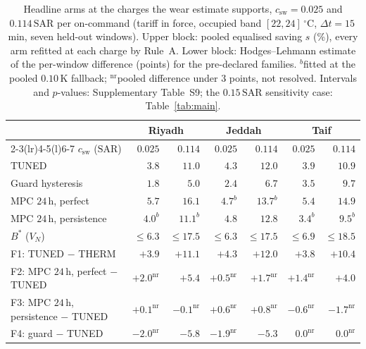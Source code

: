 \documentclass[3p,twocolumn,number]{elsarticle}
\newcommand{\csw}{c_{\mathrm{sw}}}
\newcommand{\SAR}{\text{SAR}}
\begin{document}
\begin{table}[t]
\centering
\caption{Headline arms at the charges the wear estimate supports, $\csw=0.025$ and $0.114\,\SAR$ per on-command (tariff in force, occupied band $[22,24]\,^\circ$C, $\Delta t=15\,$min, seven held-out windows). Upper block: pooled equalised saving $s$ (\%), every arm refitted at each charge by Rule~A. Lower block: Hodges--Lehmann estimate of the per-window difference (points) for the pre-declared families. $^{b}$fitted at the pooled $0.10\,$K fallback; $^{\mathrm{nr}}$pooled difference under $3$ points, not resolved. Intervals and $p$-values: Supplementary Table~S9; the $0.15\,\SAR$ sensitivity case: Table~\ref{tab:main}.}
\label{tab:derived}
\small
\begin{tabular*}{\textwidth}{@{\extracolsep{\fill}}lrrrrrr@{}}
\toprule
 & \multicolumn{2}{c}{Riyadh} & \multicolumn{2}{c}{Jeddah} & \multicolumn{2}{c}{Taif} \\
\cmidrule(lr){2-3}\cmidrule(lr){4-5}\cmidrule(l){6-7}
$\csw$ ($\SAR$) & $0.025$ & $0.114$ & $0.025$ & $0.114$ & $0.025$ & $0.114$ \\
\midrule
TUNED & $3.8$ & $11.0$ & $4.3$ & $12.0$ & $3.9$ & $10.9$ \\
Guard hysteresis & $1.8$ & $5.0$ & $2.4$ & $6.7$ & $3.5$ & $9.7$ \\
MPC $24\,$h, perfect & $5.7$ & $16.1$ & $4.7^{b}$ & $13.7^{b}$ & $5.4$ & $14.9$ \\
MPC $24\,$h, persistence & $4.0^{b}$ & $11.1^{b}$ & $4.8$ & $12.8$ & $3.4^{b}$ & $9.5^{b}$ \\
$B^{\ast}$ ($V_N$) & $\le6.3$ & $\le17.5$ & $\le6.3$ & $\le17.5$ & $\le6.9$ & $\le18.5$ \\
\midrule
F1: TUNED $-$ THERM & $+3.9$ & $+11.1$ & $+4.3$ & $+12.0$ & $+3.8$ & $+10.4$ \\
F2: MPC $24\,$h, perfect $-$ TUNED & $+2.0^{\mathrm{nr}}$ & $+5.4$ & $+0.5^{\mathrm{nr}}$ & $+1.7^{\mathrm{nr}}$ & $+1.4^{\mathrm{nr}}$ & $+4.0$ \\
F3: MPC $24\,$h, persistence $-$ TUNED & $+0.1^{\mathrm{nr}}$ & $-0.1^{\mathrm{nr}}$ & $+0.6^{\mathrm{nr}}$ & $+0.8^{\mathrm{nr}}$ & $-0.6^{\mathrm{nr}}$ & $-1.7^{\mathrm{nr}}$ \\
F4: guard $-$ TUNED & $-2.0^{\mathrm{nr}}$ & $-5.8$ & $-1.9^{\mathrm{nr}}$ & $-5.3$ & $0.0^{\mathrm{nr}}$ & $0.0^{\mathrm{nr}}$ \\
\bottomrule
\end{tabular*}
\end{table}
\end{document}
